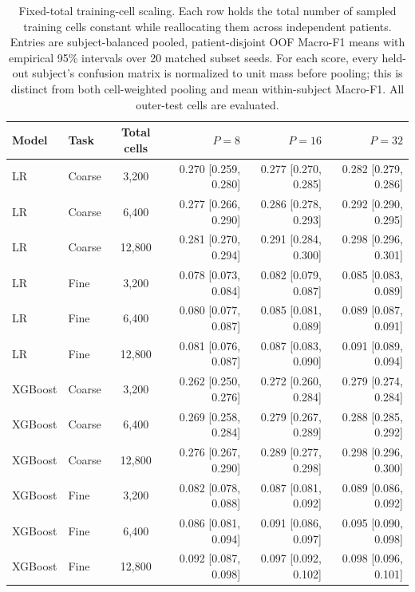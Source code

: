 \begin{table}[H]
\centering
\small
\setlength{\tabcolsep}{4pt}
\begin{tabular}{llcrrr}
\toprule
Model & Task & Total cells & $P=8$ & $P=16$ & $P=32$ \\
\midrule
LR & Coarse & 3,200 & 0.270 [0.259, 0.280] & 0.277 [0.270, 0.285] & 0.282 [0.279, 0.286] \\
LR & Coarse & 6,400 & 0.277 [0.266, 0.290] & 0.286 [0.278, 0.293] & 0.292 [0.290, 0.295] \\
LR & Coarse & 12,800 & 0.281 [0.270, 0.294] & 0.291 [0.284, 0.300] & 0.298 [0.296, 0.301] \\
LR & Fine & 3,200 & 0.078 [0.073, 0.084] & 0.082 [0.079, 0.087] & 0.085 [0.083, 0.089] \\
LR & Fine & 6,400 & 0.080 [0.077, 0.087] & 0.085 [0.081, 0.089] & 0.089 [0.087, 0.091] \\
LR & Fine & 12,800 & 0.081 [0.076, 0.087] & 0.087 [0.083, 0.090] & 0.091 [0.089, 0.094] \\
\midrule
XGBoost & Coarse & 3,200 & 0.262 [0.250, 0.276] & 0.272 [0.260, 0.284] & 0.279 [0.274, 0.284] \\
XGBoost & Coarse & 6,400 & 0.269 [0.258, 0.284] & 0.279 [0.267, 0.289] & 0.288 [0.285, 0.292] \\
XGBoost & Coarse & 12,800 & 0.276 [0.267, 0.290] & 0.289 [0.277, 0.298] & 0.298 [0.296, 0.300] \\
XGBoost & Fine & 3,200 & 0.082 [0.078, 0.088] & 0.087 [0.081, 0.092] & 0.089 [0.086, 0.092] \\
XGBoost & Fine & 6,400 & 0.086 [0.081, 0.094] & 0.091 [0.086, 0.097] & 0.095 [0.090, 0.098] \\
XGBoost & Fine & 12,800 & 0.092 [0.087, 0.098] & 0.097 [0.092, 0.102] & 0.098 [0.096, 0.101] \\
\midrule
\bottomrule
\end{tabular}
\caption{Fixed-total training-cell scaling. Each row holds the total number of sampled training cells constant while reallocating them across independent patients. Entries are subject-balanced pooled, patient-disjoint OOF Macro-F1 means with empirical 95\% intervals over 20 matched subset seeds. For each score, every held-out subject's confusion matrix is normalized to unit mass before pooling; this is distinct from both cell-weighted pooling and mean within-subject Macro-F1. All outer-test cells are evaluated.}
\label{tab:fixed_total_scaling}
\end{table}
